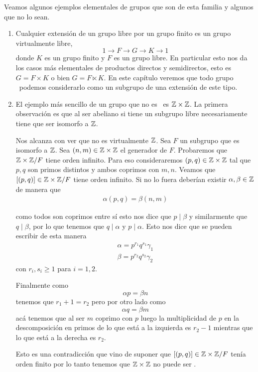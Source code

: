 \documentclass[tesis.tex]{subfiles}
\begin{document}
\begin{ej}
	Veamos algunos ejemplos elementales de grupos que son de esta familia y algunos que no lo sean.

	\begin{enumerate}	
		\item 
		Cualquier extensión de un grupo libre por un grupo finito es un grupo virtualmente libre,
		\[
		1 \to F \to G \to K \to 1
		\]
		donde $K$ es un grupo finito y $F$ es un grupo \fg libre.
		En particular esto nos da los casos más elementales de productos directos y semidirectos, esto es $G= F \times K$ o bien  $G = F \ltimes K$.
		En este capítulo veremos que todo grupo \vl \ podemos considerarlo como un subgrupo de una extensión de este tipo.
		
		\item El ejemplo más sencillo de un grupo que no es \vl \ es $\mathbb{Z} \times \mathbb{Z}$.
		La primera observación es que al ser abeliano si tiene un subgrupo libre necesariamente tiene que ser isomorfo a $\mathbb{Z}$.
		
		Nos alcanza con ver que no es virtualmente $\mathbb{Z}$.
		Sea $F$ un subgrupo que es isomorfo a $\mathbb{Z}$.
		Sea $(n,m) \in \mathbb{Z} \times \mathbb{Z}$ el generador de $F$.
		Probaremos que $\mathbb{Z} \times \mathbb{Z} / F$ tiene orden infinito.
		Para eso consideraremos $(p,q) \in \mathbb{Z} \times \mathbb{Z}$	tal que $p,q$ son primos distintos y ambos coprimos con $m,n$.
		Veamos que $[(p,q)] \in \mathbb{Z} \times \mathbb{Z} / F$ tiene orden infinito.
		Si no lo fuera deberían existir $\alpha, \beta \in \mathbb{Z}$ de manera que 
		\begin{align*}
			\alpha (p,q) = \beta(n,m) 
		\end{align*}
		
		como todos son coprimos entre sí esto nos dice que $p \mid \beta$ y similarmente que $q \mid \beta$, por lo que tenemos que $q \mid \alpha$ y $p \mid \alpha$.
		Esto nos dice que se pueden escribir de esta manera
		\begin{align*}
			\alpha = p^{r_1} q^{s_1} \gamma_1 \\
			\beta = p^{r_2} q^{s_2} \gamma_2
		\end{align*}
		con $r_i, s_i \ge 1$ para $i=1,2$.
		
		Finalmente como 
		\[ 
		\alpha p = \beta n
		\]
		tenemos que $r_1+ 1 = r_2$ pero por otro lado como
		\[
		\alpha q  = \beta m
		\]
		acá tenemos que al ser $m$ coprimo con $p$ luego la multiplicidad de $p$ en la descomposición en primos de lo que está a la izquierda es $r_2 - 1 $ mientras que lo que está a la derecha es $r_2$.
		
		Esto es una contradicción que vino de suponer que $[(p,q)] \in \mathbb{Z} \times \mathbb{Z} / F$ tenía orden finito por lo tanto tenemos que $\mathbb{Z} \times \mathbb{Z}$ no puede ser \vl.
		
	\end{enumerate}
\end{ej}
\end{document}
